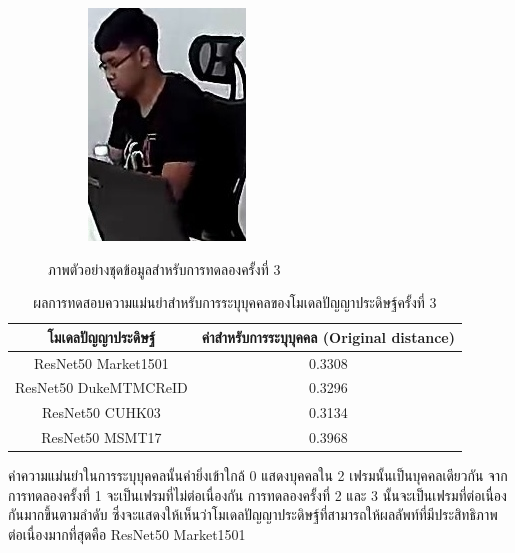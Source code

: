 \begin{figure}[!ht]
\begin{subfigure}[b]{0.2\textwidth}
        \includegraphics[width=\textwidth]{chapter4/images/fei_1.jpg}
        \label{fig:ex_6}
    \end{subfigure}
    \caption{ภาพตัวอย่างชุดข้อมูลสำหรับการทดลองครั้งที่ 3}
    \label{fig: ภาพตัวอย่างชุดข้อมูลสำหรับการทดลอง 3}
\end{figure}
\begin{table}[!ht]
    \centering
    \begin{tabular}{|c|c|}
		\hline
		{โมเดลปัญญาประดิษฐ์}&{ค่าสำหรับการระบุบุคคล (Original distance)}							\\
		\hline
		ResNet50 Market1501	 			& 0.3308								\\
		ResNet50 DukeMTMCReID			& 0.3296								\\
		ResNet50 CUHK03				& 0.3134								\\
		ResNet50 MSMT17				& 0.3968								\\
	\hline
    \end{tabular}
    \caption{ผลการทดสอบความแม่นยำสำหรับการระบุบุคคลของโมเดลปัญญาประดิษฐ์ครั้งที่ 3}
    \label{tab: Original distant of image 3}
\end{table}
ค่าความแม่นยำในการระบุบุคคลนั้นค่ายิ่งเข้าใกล้ 0 แสดงบุคคลใน 2 เฟรมนั้นเป็นบุคคลเดียวกัน จากการทดลองครั้งที่ 1 จะเป็นเฟรมที่ไม่ต่อเนื่องกัน การทดลองครั้งที่ 2 และ 3 นั้นจะเป็นเฟรมที่ต่อเนื่องกันมากขึ้นตามลำดับ ซึ่งจะแสดงให้เห็นว่าโมเดลปัญญาประดิษฐ์ที่สามารถให้ผลลัพท์ที่มีประสิทธิภาพต่อเนื่องมากที่สุดคือ ResNet50 Market1501
